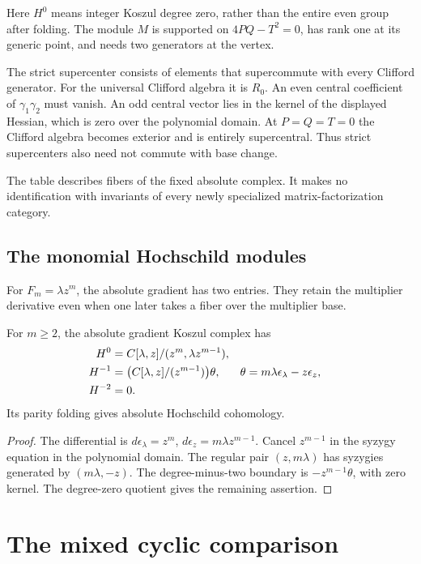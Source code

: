 Here $H^0$ means integer Koszul degree zero, rather than
the entire even group after folding. The module $M$ is
supported on $4PQ-T^2=0$, has rank one at its generic
point, and needs two generators at the vertex.

The strict supercenter consists of elements that
supercommute with every Clifford generator.
For the universal Clifford algebra it is $R_0$.
An even central coefficient of $\gamma_1\gamma_2$ must vanish.
An odd central vector lies in the kernel of the displayed
Hessian, which is zero over the polynomial domain. At $P=Q=T=0$ the Clifford
algebra becomes exterior and is entirely supercentral.
Thus strict supercenters also need not commute with base
change.

The table describes fibers of the fixed absolute
complex. It makes no identification with invariants of
every newly specialized matrix-factorization category.

\subsection{The monomial Hochschild modules}

For $F_m=\lambda z^m$, the absolute gradient has two entries.
They retain the multiplier derivative even when one later
takes a fiber over the multiplier base.

\begin{proposition}\label{mc:prop:monomial-Hochschild}
For $m\ge2$, the absolute gradient Koszul complex has
\begin{align}
 H^0&=\mathbb C[\lambda,z]/(z^m,\lambda z^{m-1}),\notag\\
 H^{-1}&=\bigl(\mathbb C[\lambda,z]/(z^{m-1})\bigr)\theta,
 &\theta&=m\lambda\epsilon_\lambda-z\epsilon_z,
 \label{mc:cgcr:eq:monomial-HH}\\
 H^{-2}&=0.\notag
\end{align}
Its parity folding gives absolute Hochschild cohomology.
\end{proposition}

\begin{proof}
The differential is
$d\epsilon_\lambda=z^m$,
$d\epsilon_z=m\lambda z^{m-1}$.
Cancel $z^{m-1}$ in the syzygy equation in the polynomial
domain. The regular pair $(z,m\lambda)$ has syzygies
generated by $(m\lambda,-z)$.
The degree-minus-two boundary is $-z^{m-1}\theta$,
with zero kernel. The degree-zero quotient gives the
remaining assertion.
\end{proof}

\section{The mixed cyclic comparison}

